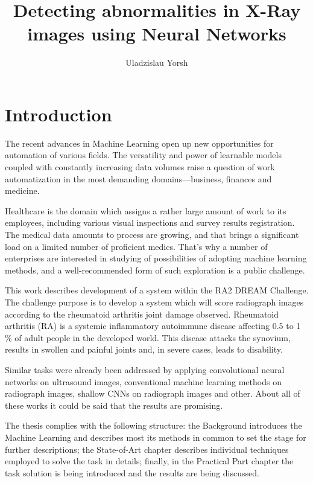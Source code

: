 \documentclass[thesis=B,english]{FITthesis}[2019/12/23]
\title{Detecting abnormalities in X-Ray images using Neural Networks}
\author{Uladzislau Yorsh} %
\begin{document}
	
	
	\chapter{Introduction}
	
	The recent advances in Machine Learning open up new opportunities for automation of various fields. The versatility and power of learnable models coupled with constantly increasing data volumes raise a question of work automatization in the most demanding domains---business, finances and medicine.
	
	Healthcare is the domain which assigns a rather large amount of work to its employees, including various visual inspections and survey results registration. The medical data amounts to process are growing, and that brings a significant load on a limited number of proficient medics. That's why a number of enterprises are interested in studying of possibilities of adopting machine learning methods, and a well-recommended form of such exploration is a public challenge.
	
	This work describes development of a system within the RA2 DREAM Challenge. The challenge purpose is to develop a system which will score radiograph images according to the rheumatoid arthritis joint damage observed. Rheumatoid arthritis (RA) is a systemic inflammatory autoimmune disease affecting 0.5 to 1 \% of adult people in the developed world. This disease attacks the synovium, results in swollen and painful joints and, in severe cases, leads to disability. 
	
	Similar tasks were already been addressed by applying convolutional neural networks on ultrasound images\cite{ra_ultrasound}, conventional machine learning methods on radiograph images\cite{ra_computer_aided}, shallow CNNs on radiograph images\cite{dl_ra} and other. About all of these works it could be said that the results are promising.
	
	The thesis complies with the following structure: the Background introduces the Machine Learning and describes most its methods in common to set the stage for further descriptions; the State-of-Art chapter describes individual techniques employed to solve the task in details; finally, in the Practical Part chapter the task solution is being introduced and the results are being discussed. 
	
\end{document}
